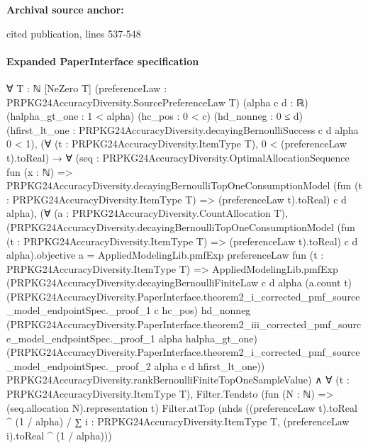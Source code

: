 \documentclass[10pt]{article}
\begin{document}
\textbf{Archival source anchor:} {\footnotesize\raggedright cited publication, lines 537-\allowbreak{}548\par}
\paragraph{Expanded PaperInterface specification}
\begin{ReviewVerbatim}
∀ {T : ℕ} [NeZero T] (preferenceLaw : PRPKG24AccuracyDiversity.SourcePreferenceLaw T) (alpha c d : ℝ)
  (halpha_gt_one : 1 < alpha) (hc_pos : 0 < c) (hd_nonneg : 0 ≤ d)
  (hfirst_lt_one : PRPKG24AccuracyDiversity.decayingBernoulliSuccess c d alpha 0 < 1),
  (∀ (t : PRPKG24AccuracyDiversity.ItemType T), 0 < (preferenceLaw t).toReal) →
    ∀
      (seq :
        PRPKG24AccuracyDiversity.OptimalAllocationSequence fun (x : ℕ) =>
          PRPKG24AccuracyDiversity.decayingBernoulliTopOneConsumptionModel
            (fun (t : PRPKG24AccuracyDiversity.ItemType T) => (preferenceLaw t).toReal) c d alpha),
      (∀ (a : PRPKG24AccuracyDiversity.CountAllocation T),
          (PRPKG24AccuracyDiversity.decayingBernoulliTopOneConsumptionModel
                  (fun (t : PRPKG24AccuracyDiversity.ItemType T) => (preferenceLaw t).toReal) c d alpha).objective
              a =
            AppliedModelingLib.pmfExp preferenceLaw fun (t : PRPKG24AccuracyDiversity.ItemType T) =>
              AppliedModelingLib.pmfExp
                (PRPKG24AccuracyDiversity.decayingBernoulliFiniteLaw c d alpha (a.count t)
                  (PRPKG24AccuracyDiversity.PaperInterface.theorem2_i_corrected_pmf_source_model_endpointSpec._proof_1 c
                    hc_pos)
                  hd_nonneg
                  (PRPKG24AccuracyDiversity.PaperInterface.theorem2_iii_corrected_pmf_source_model_endpointSpec._proof_1
                    alpha halpha_gt_one)
                  (PRPKG24AccuracyDiversity.PaperInterface.theorem2_i_corrected_pmf_source_model_endpointSpec._proof_2
                    alpha c d hfirst_lt_one))
                PRPKG24AccuracyDiversity.rankBernoulliFiniteTopOneSampleValue) ∧
        ∀ (t : PRPKG24AccuracyDiversity.ItemType T),
          Filter.Tendsto (fun (N : ℕ) => (seq.allocation N).representation t) Filter.atTop
            (nhds
              ((preferenceLaw t).toReal ^ (1 / alpha) /
                ∑ i : PRPKG24AccuracyDiversity.ItemType T, (preferenceLaw i).toReal ^ (1 / alpha)))
\end{ReviewVerbatim}
\end{document}
